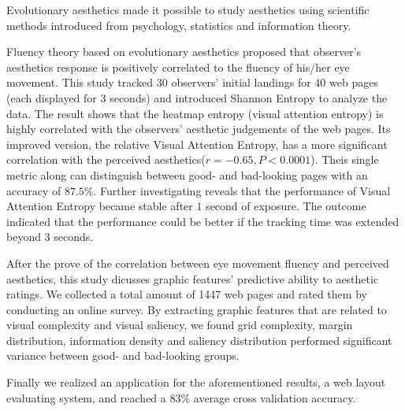 \begin{englishabstract}

Evolutionary aesthetics made it possible to study aesthetics using scientific methods introduced from psychology, statistics and information theory.

Fluency theory based on evolutionary aesthetics proposed that observer's aesthetics response is positively correlated to the fluency of his/her eye movement. This study tracked 30 observers' initial landings for 40 web pages (each displayed for 3 seconds) and introduced Shannon Entropy to analyze the data. The result shows that the heatmap entropy (visual attention entropy) is highly correlated with the observers' aesthetic judgements of the web pages. Its improved version, the relative Visual Attention Entropy, has a more significant correlation with the perceived aesthetics($r = -0.65, P < 0.0001$). Theis single metric along can distinguish between good- and bad-looking pages with an accuracy of $87.5\%$. Further investigating reveals that the performance of Visual Attention Entropy became stable after 1 second of exposure. The outcome indicated that the performance could be better if the tracking time was extended beyond 3 seconds.

After the prove of the correlation between eye movement fluency and perceived aesthetics, this study dicusses graphic features' predictive ability to aesthetic ratings.
We collected a total amount of 1447 web pages and rated them by conducting an online survey. By extracting graphic features that are related to visual complexity and visual saliency, we found grid complexity, margin distribution, information density and saliency distribution performed significant variance between good- and bad-looking groups.

Finally we realized an application for the aforementioned results, a web layout evaluating system, and reached a $83\%$ average cross validation accuracy.

\end{englishabstract}
